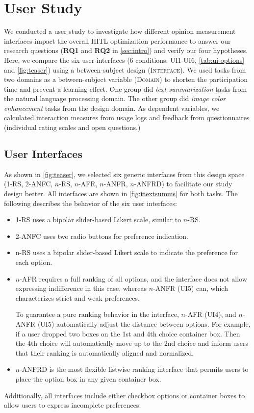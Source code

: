 \documentclass[acmsmall,screen,nonacm]{acmart}
\begin{document}
\section{User Study}
We conducted a user study to investigate how different opinion measurement interfaces impact the overall HITL optimization performance to answer our research questions (\textbf{RQ1} and \textbf{RQ2} in \autoref{sec:intro}) and verify our four hypotheses. Here, we compare the six user interfaces (6 conditions: UI1-UI6, \autoref{tab:ui-options} and \autoref{fig:teaser}) using a between-subject design (\textsc{Interface}). We used tasks from two domains as a between-subject variable (\textsc{Domain}) to shorten the participation time and prevent a learning effect. One group did \textit{text summarization} tasks from the natural language processing domain. The other group did \textit{image color enhancement} tasks from the design domain. As dependent variables, we calculated interaction measures from usage logs and feedback from questionnaires (individual rating scales and open questions.)

\subsection{User Interfaces}
As shown in \autoref{fig:teaser}, we selected six generic interfaces from this design space (1-RS, 2-ANFC, $n$-RS, $n$-AFR, $n$-ANFR, $n$-ANFRD) to facilitate our study design better. All interfaces are shown in \autoref{fig:ttextsumuis} for both tasks. The following describes the behavior of the six user interfaces:
\begin{itemize}
\item[\textbf{UI1}] 1-RS uses a bipolar slider-based Likert scale, similar to $n$-RS.

\item[\textbf{UI2}] 2-ANFC uses two radio buttons for preference indication.

\item[\textbf{UI3}] n-RS uses a bipolar slider-based Likert scale to indicate the  preference for each option.

\item[\textbf{UI4/5}] $n$-AFR requires a full ranking of all options, and the interface does not allow expressing indifference in this case, whereas $n$-ANFR (UI5) can, which characterizes strict and weak preferences.

To guarantee a pure ranking behavior in the interface, $n$-AFR (UI4), and $n$-ANFR (UI5) automatically adjust the distance between options. For example, if a user dropped two boxes on the 1st and 4th choice container box. Then the 4th choice will automatically move up to the 2nd choice and inform users that their ranking is automatically aligned and normalized.

\item[\textbf{UI6}] $n$-ANFRD is the most flexible listwise ranking interface that permits users to place the option box in any given container box.
\end{itemize}
Additionally, all interfaces include either checkbox options or container boxes to allow users to express incomplete preferences.
\end{document}
